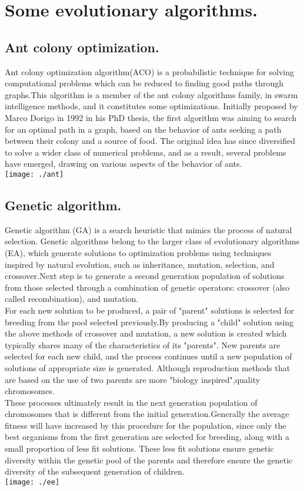 \section{Some evolutionary algorithms.}
\subsection{Ant colony optimization.}Ant colony optimization algorithm(ACO) is a probabilistic technique for solving computational problems which can be reduced to finding good paths through graphs.This algorithm is a member of the ant colony algorithms family, in swarm intelligence methods, and it constitutes some optimizations. Initially proposed by Marco Dorigo in 1992 in his PhD thesis, the first algorithm was aiming to search for an optimal path in a graph, based on the behavior of ants seeking a path between their colony and a source of food. The original idea has since diversified to solve a wider class of numerical problems, and as a result, several problems have emerged, drawing on various aspects of the behavior of ants.\\
\texttt{[image: ./ant]}\\[1cm]
\subsection{Genetic algorithm.}Genetic algorithm (GA) is a search heuristic that mimics the process of natural selection. Genetic algorithms belong to the larger class of evolutionary algorithms (EA), which generate solutions to optimization problems using techniques inspired by natural evolution, such as inheritance, mutation, selection, and crossover.Next step is to generate a second generation population of solutions from those selected through a combination of genetic operators: crossover (also called recombination), and mutation.\\
For each new solution to be produced, a pair of "parent" solutions is selected for 	breeding from the pool selected previously.By producing a "child" solution using 	the above methods of crossover and mutation, a new solution is created which typically shares many of the characteristics of its "parents". New parents are selected for each new child, and the process continues until a new population of solutions of appropriate size is generated. Although reproduction methods that are based on the use of two parents are more "biology inspired",quality chromosomes.\\
These processes ultimately result in the next generation population of 	chromosomes that is different from the initial generation.Generally the average fitness will have increased by this procedure for the population, since only the best organisms from the first generation are selected for breeding, along with a small proportion of less fit solutions. These less fit solutions ensure genetic diversity within the genetic pool of the parents and therefore ensure the genetic diversity of the subsequent generation of children.\\
\texttt{[image: ./ee]}\\[1cm]
